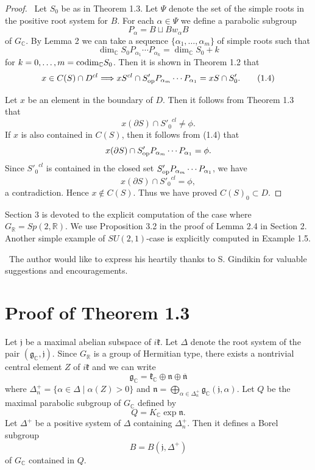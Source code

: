 \documentclass[12pt,a4paper]{amsart}
\def\frak{\mathfrak}
\theoremstyle{definition}
\theoremstyle{remark}
\numberwithin{equation}{section}
\def\br{\mathbb R}
\def\bc{\mathbb C}
\def\p{\partial}
\def\op{{\rm op}}
\begin{document}
\begin{proof} \ Let $S_0$ be as in Theorem 1.3. Let $\Psi$ denote the set of the simple roots in the  positive root system for $B$. For each $\alpha\in\Psi$ we define a parabolic subgroup
$$P_\alpha=B\sqcup Bw_\alpha B$$
of $G_\bc$. By \cite{GM2} Lemma 2 we can take a sequence $\{\alpha_1,\ldots,\alpha_m\}$ of simple roots such that
$$\dim_\bc S_0P_{\alpha_1}\cdots P_{\alpha_k}=\dim_\bc S_0+k$$
for $k=0,\ldots,m={\rm codim}_\bc S_0$. Then it is shown in \cite{M9} Theorem 1.2 that
\begin{equation}
x\in C(S)\cap D^{cl}\Longrightarrow xS^{cl}\cap S'_\op P_{\alpha_m}\cdots P_{\alpha_1}= xS\cap S'_0. \tag{1.4}
\end{equation}

Let $x$ be an element in the boundary of $D$. Then it follows from Theorem 1.3 that
$$x(\p S)\cap {S'_0}^{cl}\ne\phi.$$
If $x$ is also contained in $C(S)$, then it follows from (1.4) that
$$x(\p S)\cap S'_\op P_{\alpha_m}\cdots P_{\alpha_1}=\phi.$$
Since ${S'_0}^{cl}$ is contained in the closed set $S'_\op P_{\alpha_m}\cdots P_{\alpha_1}$, we have
$$x(\p S)\cap {S'_0}^{cl}=\phi,$$
a contradiction. Hence $x\notin C(S)$. Thus we have proved
$C(S)_0\subset D$.
\end{proof}

Section 3 is devoted to the explicit computation of the case where $G_\br=Sp(2,\br)$. We use Proposition 3.2 in the proof of Lemma 2.4 in Section 2. Another simple example of $SU(2,1)$-case is explicitly computed in \cite{M8} Example 1.5.

\bigskip
{} \ The author would like to express his heartily thanks to S.
Gindikin for valuable suggestions and encouragements.

\section{Proof of Theorem 1.3}

Let $\frak{j}$ be a maximal abelian subspace of $i\frak{k}$. Let $\Delta$ denote the root system of the pair $(\frak{g}_\bc, \frak{j})$. Since $G_\br$ is a group of Hermitian type, there exists a nontrivial central element $Z$ of $i\frak{k}$ and we can write
$$\frak{g}_\bc=\frak{k}_\bc\oplus \frak{n}\oplus \overline{\frak{n}}$$
where $\Delta^+_n=\{\alpha\in\Delta \mid \alpha(Z)>0\}$ and  $\frak{n}=\bigoplus_{\alpha\in\Delta^+_n} \frak{g}_\bc(\frak{j},\alpha)$. Let $Q$ be the maximal parabolic subgroup of $G_\bc$ defined by
$$Q=K_\bc\exp\frak{n}.$$
Let $\Delta^+$ be a positive system of $\Delta$ containing $\Delta^+_n$. Then it defines a Borel subgroup
$$B=B(\frak{j}, \Delta^+)$$
of $G_\bc$ contained in $Q$.
\end{document}
